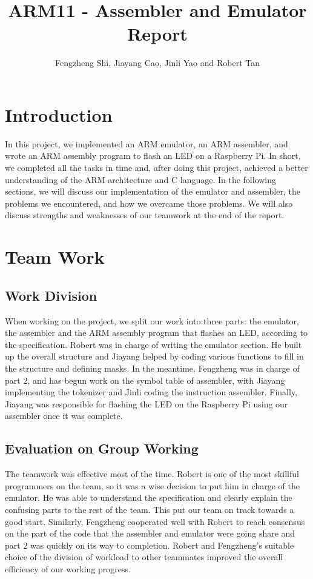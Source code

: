 \documentclass[11pt]{article}
\begin{document}
\title{ARM11 - Assembler and Emulator Report}
\author{Fengzheng Shi, Jiayang Cao, Jinli Yao and Robert Tan}

\maketitle

\section{Introduction}
In this project, we implemented an ARM emulator, an ARM assembler, and wrote an ARM assembly program to flash an LED on a Raspberry Pi. In short, we completed all the tasks in time and, after doing this project, achieved a better understanding of the ARM architecture and C language. In the following sections, we will discuss our implementation of the emulator and assembler, the problems we encountered, and how we overcame those problems. We will also discuss strengths and weaknesses of our teamwork at the end of the report.

\section{Team Work}

\subsection{Work Division}
When working on the project, we split our work into three parts: the emulator, the assembler and the ARM assembly program that flashes an LED, according to the specification. Robert was in charge of writing the emulator section. He built up the overall structure and Jiayang helped by coding various functions to fill in the structure and defining masks. In the meantime, Fengzheng was in charge of part 2, and has begun work on the symbol table of assembler, with Jiayang implementing the tokenizer and Jinli coding the instruction assembler. Finally, Jiayang was responsible for flashing the LED on the Raspberry Pi using our assembler once it was complete. 

\subsection{Evaluation on Group Working}
The teamwork was effective most of the time. Robert is one of the most skillful programmers on the team, so it was a wise decision to put him in charge of the emulator. He was able to understand the specification and clearly explain the confusing parts to the rest of the team. This put our team on track towards a good start. Similarly, Fengzheng cooperated well with Robert to reach consensus on the part of the code that the assembler and emulator were going share and part 2 was quickly on its way to completion. Robert and Fengzheng's suitable choice of the division of workload to other teammates improved the overall efficiency of our working progress.\newline
\end{document}
